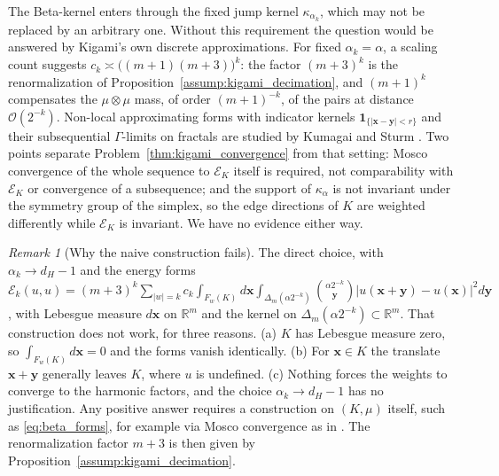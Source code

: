 \documentclass[11pt,a4paper]{article}
\theoremstyle{plain}
\theoremstyle{definition}
\theoremstyle{remark}
\newtheorem{remark}[theorem]{Remark}
\numberwithin{equation}{section}
\begin{document}
The Beta-kernel enters through the fixed jump kernel $\kappa_{\alpha_k}$, which may not be replaced by an arbitrary one. Without this requirement the question would be answered by Kigami's own discrete approximations. For fixed $\alpha_k = \alpha$, a scaling count suggests $c_k \asymp \big((m+1)(m+3)\big)^k$: the factor $(m+3)^k$ is the renormalization of Proposition~\ref{assump:kigami_decimation}, and $(m+1)^k$ compensates the $\mu \otimes \mu$ mass, of order $(m+1)^{-k}$, of the pairs at distance $\mathcal{O}(2^{-k})$. Non-local approximating forms with indicator kernels $\mathbf{1}_{\{|\mathbf{x}-\mathbf{y}|<r\}}$ and their subsequential $\Gamma$-limits on fractals are studied by Kumagai and Sturm \cite{kumagaisturm2005}. Two points separate Problem~\ref{thm:kigami_convergence} from that setting: Mosco convergence of the whole sequence to $\mathcal{E}_K$ itself is required, not comparability with $\mathcal{E}_K$ or convergence of a subsequence; and the support of $\kappa_\alpha$ is not invariant under the symmetry group of the simplex, so the edge directions of $K$ are weighted differently while $\mathcal{E}_K$ is invariant. We have no evidence either way.

\begin{remark}[Why the naive construction fails]
\label{rem:naive_fails}
The direct choice, with $\alpha_k \to d_H - 1$ and the energy forms
$\mathcal{E}_k(u,u) = (m+3)^k \sum_{|w|=k} c_k \int_{F_w(K)} d\mathbf{x}\int_{\Delta_{m}(\alpha 2^{-k})} \binom{\alpha 2^{-k}}{\mathbf{y}}|u(\mathbf{x}+\mathbf{y}) - u(\mathbf{x})|^2 d\mathbf{y}$, with Lebesgue measure $d\mathbf{x}$ on $\mathbb{R}^m$ and the kernel on $\Delta_m(\alpha 2^{-k}) \subset \mathbb{R}^m$. That construction does not work, for three reasons.
(a) $K$ has Lebesgue measure zero, so $\int_{F_w(K)} d\mathbf{x} = 0$ and the forms vanish identically.
(b) For $\mathbf{x} \in K$ the translate $\mathbf{x} + \mathbf{y}$ generally leaves $K$, where $u$ is undefined.
(c) Nothing forces the weights to converge to the harmonic factors, and the choice $\alpha_k \to d_H - 1$ has no justification.
Any positive answer requires a construction on $(K,\mu)$ itself, such as \eqref{eq:beta_forms}, for example via Mosco convergence as in \cite{kigami2001}. The renormalization factor $m+3$ is then given by Proposition~\ref{assump:kigami_decimation}.
\end{remark}
\end{document}
